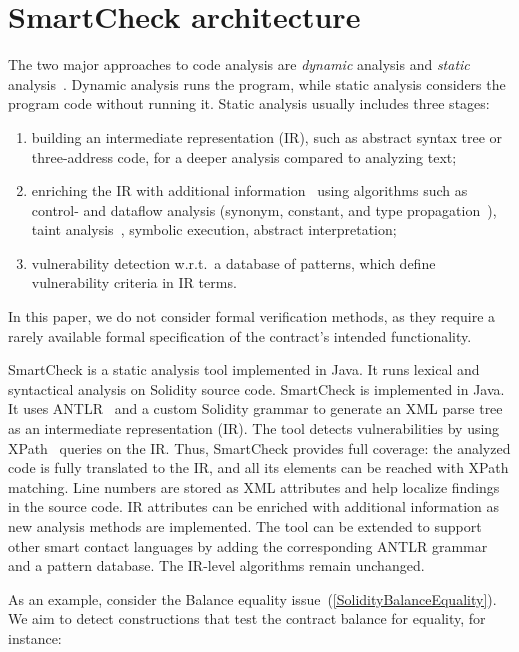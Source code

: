 \section{SmartCheck architecture}

The two major approaches to code analysis are \textit{dynamic} analysis and \textit{static} analysis~\cite{Liu2012}.
Dynamic analysis runs the program, while static analysis considers the program code without running it.
Static analysis usually includes three stages:
\begin{enumerate}
	\item building an intermediate representation (IR), such as abstract syntax tree or three-address code, for a deeper analysis compared to analyzing text;
	\item enriching the IR with additional information~\cite{Woegerer2005} using algorithms such as control- and dataflow analysis (synonym, constant, and type propagation~\cite{Aho1986}), taint analysis~\cite{Tripp2009}, symbolic execution, abstract interpretation;
	\item vulnerability detection w.r.t.~a database of patterns, which define vulnerability criteria in IR terms.
\end{enumerate}
In this paper, we do not consider formal verification methods, as they require a rarely available formal specification of the contract's intended functionality.

SmartCheck is a static analysis tool implemented in Java.
It runs lexical and syntactical analysis on Solidity source code.
SmartCheck is implemented in Java.
It uses ANTLR~\cite{Parr} and a custom Solidity grammar to generate an XML parse tree~\cite{Aho1986} as an intermediate representation (IR).
The tool detects vulnerabilities by using XPath~\cite{Liu2009} queries on the IR\@.
Thus, SmartCheck provides full coverage: the analyzed code is fully translated to the IR, and all its elements can be reached with XPath matching.
Line numbers are stored as XML attributes and help localize findings in the source code.
IR attributes can be enriched with additional information as new analysis methods are implemented.
The tool can be extended to support other smart contact languages by adding the corresponding ANTLR grammar and a pattern database.
The IR-level algorithms remain unchanged.

As an example, consider the Balance equality issue~(\ref{SolidityBalanceEquality}).
We aim to detect constructions that test the contract balance for equality, for instance:

